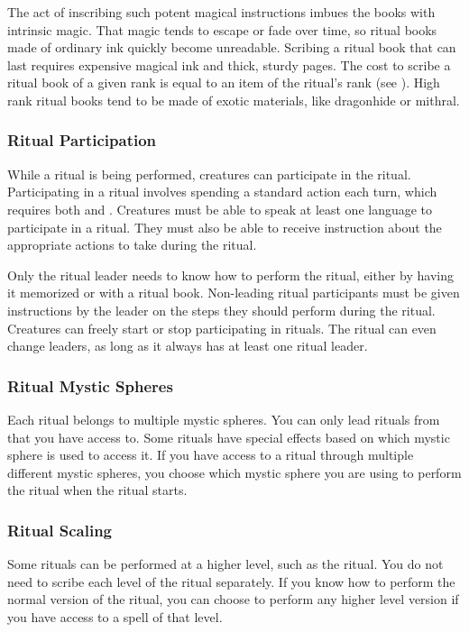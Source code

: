       The act of inscribing such potent magical instructions imbues the books with intrinsic magic.
      That magic tends to escape or fade over time, so ritual books made of ordinary ink quickly become unreadable.
      Scribing a ritual book that can last requires expensive magical ink and thick, sturdy pages.
      The cost to scribe a ritual book of a given rank is equal to an item of the ritual's rank (see ).
      High rank ritual books tend to be made of exotic materials, like dragonhide or mithral.

    \subsubsection{Ritual Participation}
      While a ritual is being performed, creatures can participate in the ritual.
      Participating in a ritual involves spending a standard action each turn, which requires both  and .
      Creatures must be able to speak at least one language to participate in a ritual.
      They must also be able to receive instruction about the appropriate actions to take during the ritual.

      Only the ritual leader needs to know how to perform the ritual, either by having it memorized or with a ritual book.
      Non-leading ritual participants must be given instructions by the leader on the steps they should perform during the ritual.
      Creatures can freely start or stop participating in rituals.
      The ritual can even change leaders, as long as it always has at least one ritual leader.

    \subsubsection{Ritual Mystic Spheres}
      Each ritual belongs to multiple mystic spheres.
      You can only lead rituals from  that you have access to.
      Some rituals have special effects based on which mystic sphere is used to access it.
      If you have access to a ritual through multiple different mystic spheres, you choose which mystic sphere you are using to perform the ritual when the ritual starts.

    \subsubsection{Ritual Scaling}
      Some rituals can be performed at a higher level, such as the  ritual.
      You do not need to scribe each level of the ritual separately.
      If you know how to perform the normal version of the ritual, you can choose to perform any higher level version if you have access to a spell of that level.

